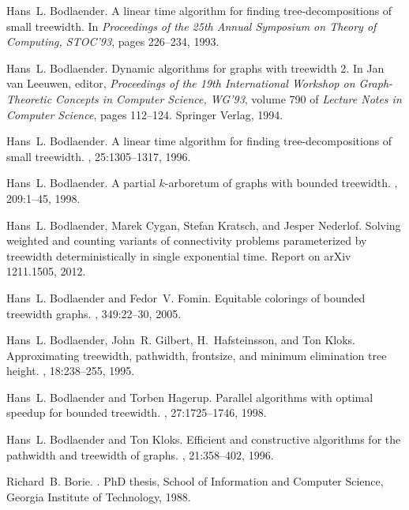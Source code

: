 \documentclass[a4paper,11pt]{article}
\theoremstyle{definition}
\theoremstyle{remark}
\begin{document}
\begin{thebibliography}{10}
Hans~L. Bodlaender.
\newblock A linear time algorithm for finding tree-decompositions of small
  treewidth.
\newblock In {\em Proceedings of the 25th Annual Symposium on Theory of
  Computing, STOC'93}, pages 226--234, 1993.

Hans~L. Bodlaender.
\newblock Dynamic algorithms for graphs with treewidth 2.
\newblock In Jan van Leeuwen, editor, {\em Proceedings of the 19th
  International Workshop on Graph-Theoretic Concepts in Computer Science,
  WG'93}, volume 790 of {\em Lecture Notes in Computer Science}, pages
  112--124. Springer Verlag, 1994.

Hans~L. Bodlaender.
\newblock A linear time algorithm for finding tree-decompositions of small
  treewidth.
, 25:1305--1317, 1996.

Hans~L. Bodlaender.
\newblock A partial $k$-arboretum of graphs with bounded treewidth.
, 209:1--45, 1998.

Hans~L. Bodlaender, Marek Cygan, Stefan Kratsch, and Jesper Nederlof.
\newblock Solving weighted and counting variants of connectivity problems
  parameterized by treewidth deterministically in single exponential time.
\newblock Report on arXiv 1211.1505, 2012.

Hans~L. Bodlaender and Fedor~V. Fomin.
\newblock Equitable colorings of bounded treewidth graphs.
, 349:22--30, 2005.

Hans~L. Bodlaender, John~R. Gilbert, H.~Hafsteinsson, and Ton Kloks.
\newblock Approximating treewidth, pathwidth, frontsize, and minimum
  elimination tree height.
, 18:238--255, 1995.

Hans~L. Bodlaender and Torben Hagerup.
\newblock Parallel algorithms with optimal speedup for bounded treewidth.
, 27:1725--1746, 1998.

Hans~L. Bodlaender and Ton Kloks.
\newblock Efficient and constructive algorithms for the pathwidth and treewidth
  of graphs.
, 21:358--402, 1996.

Richard~B. Borie.
.
\newblock PhD thesis, School of Information and Computer Science, Georgia
  Institute of Technology, 1988.


\end{thebibliography}
\end{document}
